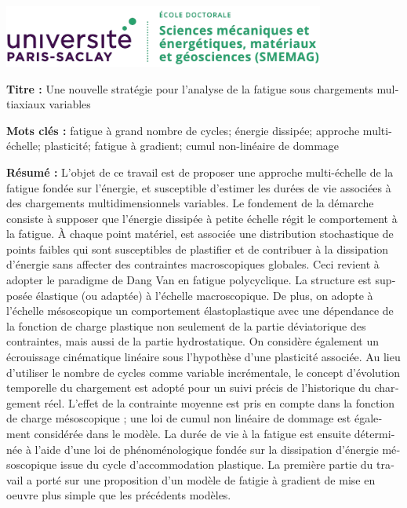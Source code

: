 \pagestyle{empty}

\begin{flushleft}
\includegraphics[width=300pt]{figures/SMEMAG.png}

\vspace{20pt}

\begin{mdframed}
\begin{otherlanguage}{french}
\textbf{Titre :} Une nouvelle stratégie pour l'analyse de la fatigue sous chargements multiaxiaux variables

\textbf{Mots clés :} fatigue à grand nombre de cycles; énergie dissipée; approche multi-échelle; plasticité; fatigue à gradient;
cumul non-linéaire de dommage

\textbf{Résumé :} L'objet de ce travail est de proposer une approche multi-échelle de la fatigue fondée sur l'énergie, et
susceptible d'estimer les durées de vie associées à des chargements multidimensionnels variables. Le fondement de la démarche
consiste à supposer que l'énergie dissipée à petite échelle régit le comportement à la fatigue. À chaque point matériel, est
associée une distribution stochastique de points faibles qui sont susceptibles de plastifier et de contribuer à la dissipation
d'énergie sans affecter des contraintes macroscopiques globales. Ceci revient à adopter le paradigme de Dang Van en fatigue
polycyclique. La structure est supposée élastique (ou adaptée) à l'échelle macroscopique. De plus, on adopte à l'échelle
mésoscopique un comportement élastoplastique avec une dépendance de la fonction de charge plastique non seulement
de la partie déviatorique des contraintes, mais aussi de la partie hydrostatique. On considère également un écrouissage
cinématique linéaire sous l'hypothèse d'une plasticité associée. Au lieu d'utiliser le nombre de cycles comme variable
incrémentale, le concept d'évolution temporelle du chargement est adopté pour un suivi précis de l'historique du chargement réel.
L'effet de la contrainte moyenne est pris en compte dans la fonction de charge mésoscopique ; une loi de cumul non linéaire de
dommage est également considérée dans le modèle. La durée de vie à la fatigue est ensuite déterminée à l'aide d'une loi de
phénoménologique fondée sur la dissipation d'énergie mésoscopique issue du cycle d'accommodation plastique.
La première partie du travail a porté sur une proposition d'un modèle de fatigie à gradient de mise en oeuvre plus simple que les
précédents modèles.





\end{otherlanguage}
\end{mdframed}
\end{flushleft}
